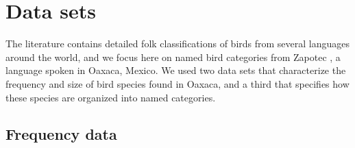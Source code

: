 \documentclass[10pt,letterpaper]{article}
\begin{document}


%
%
%
%
%
%
%



\section{Data sets}


The literature contains detailed folk classifications of birds from several languages around the world, and we focus here on named bird categories from Zapotec \cite{hunn2008zapotec}, a language spoken in Oaxaca, Mexico.  We used two data sets that characterize the frequency and size of bird species found in Oaxaca, and a third that specifies how these species are organized into named categories.

\subsection{Frequency data}
\end{document}
